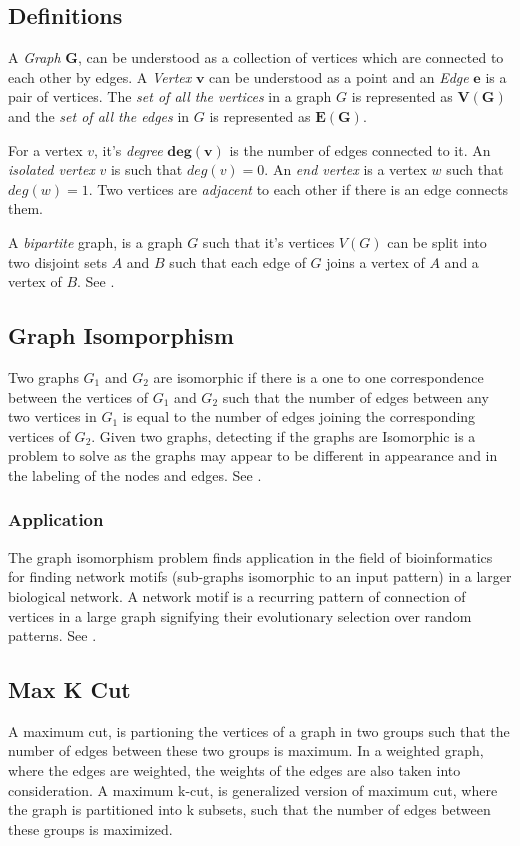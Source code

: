 \subsection{Definitions}
A \emph{Graph} $\boldsymbol{G}$, can be understood as a collection of vertices which are
connected to each other by edges.  A \emph{Vertex} $\boldsymbol{v}$ can be understood as a
point and an \emph{Edge} $\boldsymbol{e}$ is a pair of vertices.  The \emph{set of all the vertices}
in a graph $G$ is represented as $\boldsymbol{V(G)}$ and the \emph{set of all the
edges} in $G$ is represented as $\boldsymbol{E(G)}$.

For a vertex $v$, it's \emph{degree} $\boldsymbol{deg(v)}$ is the number of edges
connected to it.  An \emph{isolated vertex} $v$ is such that $deg(v) = 0$. An
\emph{end vertex} is a vertex $w$ such that $deg(w) = 1$.  Two vertices are
\emph{adjacent} to each other if there is an edge connects them.

A \emph{bipartite} graph, is a graph $G$ such that it's vertices $V(G)$ can
be split into two disjoint sets $A$ and $B$ such that each edge of $G$ joins a
vertex of $A$ and a vertex of $B$. See \cite{Newman10}.


\subsection{Graph Isomporphism}
Two graphs $G_1$ and $G_2$ are isomorphic if there is a one to one correspondence
between the vertices of $G_1$ and $G_2$ such that the number of edges between any
two vertices in $G_1$ is equal to the number of edges joining the corresponding
vertices of $G_2$.  Given two graphs, detecting if the graphs are Isomorphic is
a problem to solve as the graphs may appear to be different in appearance and
in the labeling of the nodes and edges. See \cite{Newman10}.

\subsubsection{Application}
The graph isomorphism problem finds application in the field of bioinformatics
for finding network motifs (sub-graphs isomorphic to an input pattern) in a
larger biological network. A network motif is a recurring pattern of connection
of vertices in a large graph signifying their evolutionary selection over
random patterns. See \cite{Bonnici2013}.

\subsection{Max K Cut}
A maximum cut, is partioning the vertices of a graph in two groups such that
the number of edges between these two groups is maximum. In a weighted graph,
where the edges are weighted, the weights of the edges are also taken into
consideration.  A maximum k-cut, is generalized version of maximum cut, where
the graph is partitioned into k subsets, such that the number of edges between
these groups is maximized.

